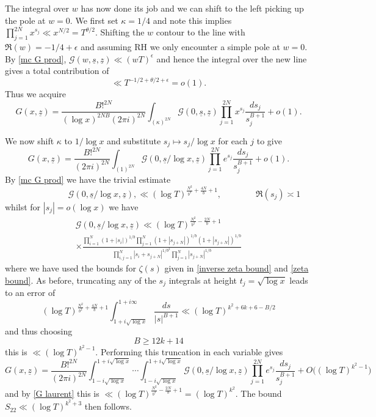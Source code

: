 \documentclass[oneside, 12pt]{amsart}
\theoremstyle{definition}
\newcommand{\mc}{\mathcal}
\newcommand{\ul}{\underline}
\newcommand{\geqs}{\geqslant }
\newcommand{\ben}{\begin{equation}}
\newcommand{\een}{\end{equation} }
\begin{document}
The integral over $w$ has now done its job and we can shift to the left picking up the pole at $w=0$. We first set $\kappa=1/4$
and note this implies $\prod_{j=1}^{2N}x^{s_j}\ll x^{N/2}=T^{\theta/2}$. Shifting the $w$ contour to the line with $\Re(w)=-1/4+\epsilon$ and assuming RH we only encounter a simple pole at $w=0$. By \eqref{mc G prod}, $\mc{G}(w,\ul{s},\ul{z})\ll(wT)^{\epsilon}$ and hence the integral over the new line gives a total contribution of 
\[
\ll T^{-1/2+\theta/2+\epsilon}=o(1).
\]
Thus we acquire 
\[
G(x,\ul{z})
=
\frac{B!^{2N}}{(\log x)^{2NB}(2\pi i)^{2N}}
\int_{(\kappa)^{2N}}
\mc{G}(0,\underline{s},\underline{z})\prod_{j=1}^{2N}x^{s_j}\frac{ds_j}{s_j^{B+1}}
+o(1).
\]


We now shift $\kappa$ to $1/\log x$ and  substitute $s_j\mapsto s_j/\log x$ for each $j$ to give 
\[
G(x,\ul{z})
=
\frac{B!^{2N}}{(2\pi i)^{2N}}
\int_{(1)^{2N}}
\mc{G}(0,\underline{s}/\log x,\underline{z})\prod_{j=1}^{2N}e^{s_j}\frac{ds_j}{s_j^{B+1}}
+o(1).
\]
By \eqref{mc G prod} we have the trivial estimate
\ben
\label{G trivial}
\qquad\qquad\qquad\mc{G}(0,\underline{s}/\log x,\underline{z}), 
\ll
(\log T)^{\frac{N^2}{b^2}+\frac{4N}{b}+1},
\qquad\qquad\Re(s_j)\asymp 1
\een
whilst for $|s_j|=o(\log x)$ we have 
\begin{multline}
\label{G laurent}
\mc{G}(0,\underline{s}/\log x,\underline{z})
\ll
(\log T)^{\frac{N^2}{b^2}-\frac{2N}{b}+1} 
\\
\times
\frac{\prod_{i=1}^N(1+|s_i|)^{1/b}\prod_{j=1}^N(1+|s_{j+N}|)^{1/b}(1+|s_{j+N}|)^{1/b}}
{\prod_{i,j=1}^N|s_i+s_{j+N}|^{1/b^2}\prod_{j=1}^N |s_{j+N}|^{1/b}}
\end{multline}
where we have used the bounds for $\zeta(s)$ given in \eqref{inverse zeta bound} and \eqref{zeta bound}. As before, truncating any of the $s_j$ integrals at height $t_j=\sqrt{\log x}$ leads to an error of 
\[
(\log T)^{\frac{N^2}{b^2}+\frac{4N}{b}+1}\int_{1+i\sqrt{\log x}}^{1+i\infty}\frac{ds}{|s|^{B+1}}
\ll
(\log T)^{k^2+6k+6-B/2} 
\]
and thus choosing \[B\geqs 12k+14\] this is $\ll (\log T)^{k^2-1}$. Performing this truncation in each variable gives
\[
G(x,\ul{z})
=
\frac{B!^{2N}}{(2\pi i)^{2N}}
\int_{1-i\sqrt{\log x}}^{1+i\sqrt{\log x}}\!\!\!\!\!\!\cdots\int_{1-i\sqrt{\log x}}^{1+i\sqrt{\log x}}
\mc{G}(0,\underline{s}/\log x,\underline{z})\prod_{j=1}^{2N}e^{s_j}\frac{ds_j}{s_j^{B+1}}
+O\big((\log T)^{k^2-1}\big)
\]
and by \eqref{G laurent} this is $\ll(\log T)^{\frac{N^2}{b^2}-\frac{2N}{b}+1} 
= (\log T)^{k^2}$. The bound $S_{22}\ll (\log T)^{k^2+3}$ then follows.
\end{document}
